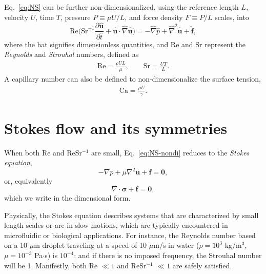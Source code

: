 Eq.\ \eqref{eq:NS} can be further non-dimensionalized, using the reference length $L$, velocity $U$, time $T$, pressure $P \equiv \mu U/L$, and force density $F \equiv P/L$ scales, into
\begin{equation}
   \textrm{Re} \bigg(\textrm{Sr}^{-1} \frac{\partial \hat{\bm u}}{\partial \hat{t}} + \hat{\bm u} \cdot \hat{\nabla} \hat{\bm u} \bigg) =
   -\hat{\nabla} \hat{p} + \hat{\nabla} ^2  \hat{\bm u} + \hat{\bm f},
  \label{eq:NS-nondi}
\end{equation}
where the hat signifies dimensionless quantities, and Re and Sr represent the \emph{Reynolds} and \emph{Strouhal} numbers, defined as
\begin{equation}
  \begin{aligned}
    \textrm{Re} = \frac{\rho UL}{\mu},\quad \quad \textrm{Sr} = \frac{UT}{L}.
  \end{aligned}
\end{equation}
A capillary number can also be defined to non-dimensionalize the surface tension,
\begin{equation}
  \begin{aligned}
    \textrm{Ca} = \frac{\mu U}{\gamma}.
  \end{aligned}
\end{equation}




\section{Stokes flow and its symmetries}
\label{sec:stokes-flows}

When both Re and ReSr$^{-1}$ are small, Eq.\ \eqref{eq:NS-nondi} reduces to the \emph{Stokes equation},
\begin{equation}
   -\nabla p + \mu \nabla ^2  {\bm u} + {\bm f} = {\bm 0},
 \label{eq:Stokes}
\end{equation}
or, equivalently
\begin{equation}
   \nabla \cdot  {\bm \sigma} + {\bm f} = {\bm 0},
 \label{eq:Stokes1}
\end{equation}
which we write in the dimensional form.

Physically, the Stokes equation describes systems that are characterized by small length scales or are in slow motions, which are typically encountered in microfluidic or biological applications.
For instance, the Reynolds number based on a 10 $\mu$m droplet traveling at a speed of 10 $\mu$m/s in water ($\rho=10^3$ kg/m$^{3}$, $\mu=10^{-3}$ Pa$\cdot$s) is $10^{-4}$;
and if there is no imposed frequency, the Strouhal number will be 1.
Manifestly, both Re $\ll 1$ and ReSr$^{-1}$ $\ll 1$ are safely satisfied.


